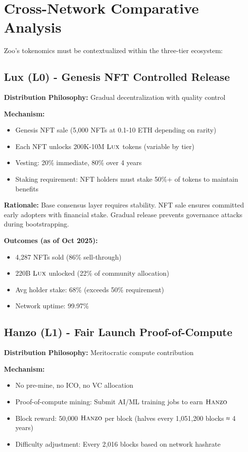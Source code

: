 \section{Cross-Network Comparative Analysis}


Zoo's tokenomics must be contextualized within the three-tier ecosystem:

\subsection{Lux (L0) - Genesis NFT Controlled Release}

\textbf{Distribution Philosophy:} Gradual decentralization with quality control

\textbf{Mechanism:}
\begin{itemize}
\item Genesis NFT sale (5,000 NFTs at 0.1-10 ETH depending on rarity)
\item Each NFT unlocks 200K-10M $\textsc{Lux}$ tokens (variable by tier)
\item Vesting: 20\% immediate, 80\% over 4 years
\item Staking requirement: NFT holders must stake 50\%+ of tokens to maintain benefits
\end{itemize}

\textbf{Rationale:} Base consensus layer requires stability. NFT sale ensures committed early adopters with financial stake. Gradual release prevents governance attacks during bootstrapping.

\textbf{Outcomes (as of Oct 2025):}
\begin{itemize}
\item 4,287 NFTs sold (86\% sell-through)
\item 220B $\textsc{Lux}$ unlocked (22\% of community allocation)
\item Avg holder stake: 68\% (exceeds 50\% requirement)
\item Network uptime: 99.97\%
\end{itemize}

\subsection{Hanzo (L1) - Fair Launch Proof-of-Compute}

\textbf{Distribution Philosophy:} Meritocratic compute contribution

\textbf{Mechanism:}
\begin{itemize}
\item No pre-mine, no ICO, no VC allocation
\item Proof-of-compute mining: Submit AI/ML training jobs to earn $\textsc{Hanzo}$
\item Block reward: 50,000 $\textsc{Hanzo}$ per block (halves every 1,051,200 blocks ≈ 4 years)
\item Difficulty adjustment: Every 2,016 blocks based on network hashrate
\end{itemize}

